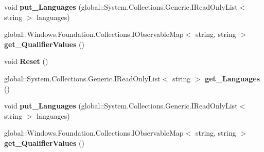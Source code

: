 \begin{DoxyCompactItemize}
\mbox{\label{interface_windows_1_1_application_model_1_1_resources_1_1_core_1_1_i_resource_context_a6f1d9a3b30a2b326bcbad29ebaa379fb}} 
void {\bfseries put\+\_\+\+Languages} (global\+::\+System.\+Collections.\+Generic.\+I\+Read\+Only\+List$<$ string $>$ languages)
\item 
\mbox{\label{interface_windows_1_1_application_model_1_1_resources_1_1_core_1_1_i_resource_context_a90ec12fc8e5744d350fc3ea54c940698}} 
global\+::\+Windows.\+Foundation.\+Collections.\+I\+Observable\+Map$<$ string, string $>$ {\bfseries get\+\_\+\+Qualifier\+Values} ()
\item 
\mbox{\label{interface_windows_1_1_application_model_1_1_resources_1_1_core_1_1_i_resource_context_ab035b013f5685da0aea1993176acf64c}} 
void {\bfseries Reset} ()
\item 
\mbox{\label{interface_windows_1_1_application_model_1_1_resources_1_1_core_1_1_i_resource_context_ad76a6478d3e3e15758a66c66adf8c42a}} 
global\+::\+System.\+Collections.\+Generic.\+I\+Read\+Only\+List$<$ string $>$ {\bfseries get\+\_\+\+Languages} ()
\item 
\mbox{\label{interface_windows_1_1_application_model_1_1_resources_1_1_core_1_1_i_resource_context_a6f1d9a3b30a2b326bcbad29ebaa379fb}} 
void {\bfseries put\+\_\+\+Languages} (global\+::\+System.\+Collections.\+Generic.\+I\+Read\+Only\+List$<$ string $>$ languages)
\item 
\mbox{\label{interface_windows_1_1_application_model_1_1_resources_1_1_core_1_1_i_resource_context_a90ec12fc8e5744d350fc3ea54c940698}} 
global\+::\+Windows.\+Foundation.\+Collections.\+I\+Observable\+Map$<$ string, string $>$ {\bfseries get\+\_\+\+Qualifier\+Values} ()
\item 
\mbox{\label{interface_windows_1_1_application_model_1_1_resources_1_1_core_1_1_i_resource_context_ab035b013f5685da0aea1993176acf64c}} 

\end{DoxyCompactItemize}
